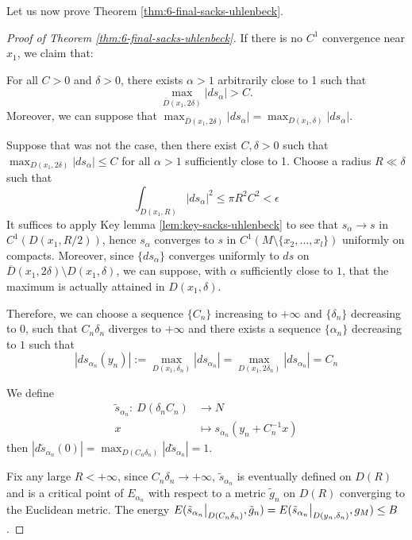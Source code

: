 Let us now prove Theorem \ref{thm:6-final-sacks-uhlenbeck}.

\begin{proof}[Proof of Theorem \ref{thm:6-final-sacks-uhlenbeck}]
If there is no \(C^1\) convergence near \(x_1\), we claim that:

\begin{assertion}
\label{assert:3-star}
For all \(C>0\) and \(\delta >0\), there exists \(\alpha >1\) arbitrarily close to 1 such that
\[
 \max_{\overline{D}(x_1,2\delta)}|ds_\alpha|  > C.
\]
Moreover, we can suppose that \(\max_{\overline{D}(x_1,2\delta)}|ds_\alpha| = \max_{D(x_1,\delta)}|ds_\alpha|\).
\end{assertion}


Suppose that was not the case, then there exist \(C,\delta >0\) such that \(\max_{D(x_1,2\delta)} |ds_\alpha| \leq C\) for all \(\alpha>1\) sufficiently close
to 1. Choose a radius \(R \ll \delta\) such that
\[
 \int_{D(x_1,R)} |ds_\alpha|^2 \leq \pi R^2 C^2 <\epsilon
\]
It suffices to apply Key lemma \ref{lem:key-sacks-uhlenbeck} to see that \(s_\alpha \to s\) in \(C^1(D(x_1,R/2))\), hence \(s_\alpha\) converges to \(s\) in \(C^1(M\setminus\{x_2,\dots,x_l\})\) uniformly on compacts. Moreover, since \(\{ds_\alpha\}\) converges uniformly to \(ds\) on \(\overline{D}(x_1,2\delta)\setminus
D(x_1,\delta)\), we can suppose, with \(\alpha\) sufficiently close to \(1\), that the
maximum is actually attained in \(D(x_1,\delta)\).


Therefore, we can choose a sequence \(\{C_n\}\) increasing to \(+\infty\) and \(\{\delta_n\}\)
decreasing to \(0\), such that \(C_n\delta_n\) diverges to \(+\infty\) and there exists a sequence \(\{\alpha_n\}\) decreasing to \(1\)
such that
\[
 \left| ds_{\alpha_n}(y_n)\right|:=\max_{D(x_1,\delta_n)}|ds_{\alpha_n}|=\max_{D(x_1,2\delta_n)}|ds_{\alpha_n}| = C_n
\]

We define 
\begin{align*}
  \tilde s_{\alpha_n}:\ D(\delta_n C_n) & \longrightarrow N \\
  	 		x	   	&\longmapsto 	  s_{\alpha_n}(y_n + C^{-1}_nx)
\end{align*}
then \(|d\tilde s_{\alpha_n}(0)|= \max_{D(C_n\delta_n)}|d\tilde s_{\alpha_n}| = 1\).

Fix any large \(R <+\infty\), since \(C_n\delta_n\to +\infty\), \(\tilde s_{\alpha_n}\)  is eventually defined on \(D(R)\) and is a critical point of \(E_{\alpha_n}\) with
respect to a metric \(\tilde g_n\) on \(D(R)\) converging to the Euclidean metric. The
energy \(E(\restr{\tilde s_{\alpha_n}}{D(C_n\delta_n)},\tilde g_n) = E(\restr{\tilde
s_{\alpha_n}}{D(y_n,\delta_n)},g_M)\leq B\).


\end{proof}
